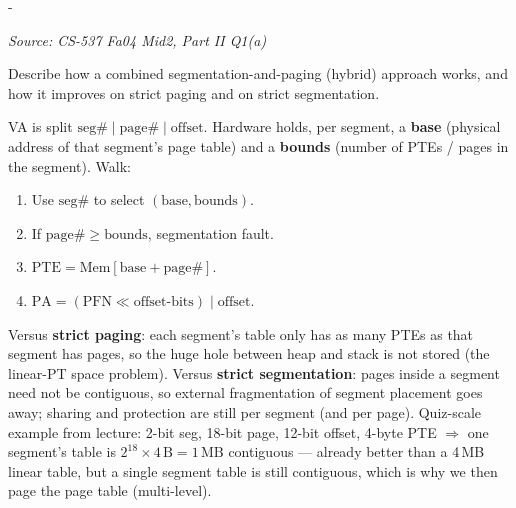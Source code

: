 \documentclass[11pt,a4paper]{article}
\makeatletter
\newcommand{\keepspace}[1]{\par\penalty-100\begingroup
  \setlength{\dimen@}{#1}\dimen@ii\pagegoal\advance\dimen@ii-\pagetotal
  \ifdim\dimen@>\dimen@ii\ifdim\dimen@ii>\z@\vfil\fi\break\fi\endgroup}
\newcounter{qn}[section]
\newenvironment{Qn}[4]{%
  \refstepcounter{qn}\keepspace{7\baselineskip}%
  \begin{tcolorbox}[qboxstyle, title={Q\thesection.\theqn\ \ [#1 \textbar\ #2]\ \ #4}]%
  {\footnotesize\color{g3}\textit{Source: #3}}\par\smallskip%
}{%
  \end{tcolorbox}%
}
\newenvironment{Sol}{%
  \begin{tcolorbox}[sboxstyle, title={Solution}]%
}{%
  \end{tcolorbox}\vspace{0.35em}%
}
\makeatother
\begin{document}
\begin{Qn}{Medium-Hard}{Lect 14}{CS-537 Fa04 Mid2, Part II Q1(a)}{Combined segmentation and paging}
Describe how a combined segmentation-and-paging (hybrid) approach works,
and how it improves on strict paging and on strict segmentation.
\end{Qn}
\begin{Sol}
VA is split $\mathrm{seg}\# \mid \mathrm{page}\# \mid \mathrm{offset}$.
Hardware holds, per segment, a \textbf{base} (physical address of that
segment's page table) and a \textbf{bounds} (number of PTEs / pages in
the segment). Walk:
\begin{enumerate}
\item Use $\mathrm{seg}\#$ to select $(\mathrm{base},\mathrm{bounds})$.
\item If $\mathrm{page}\# \ge \mathrm{bounds}$, segmentation fault.
\item $\mathrm{PTE} = \mathrm{Mem}[\mathrm{base} + \mathrm{page}\#]$.
\item $\mathrm{PA} = (\mathrm{PFN}\ll \mathrm{offset\text{-}bits})
      \mid \mathrm{offset}$.
\end{enumerate}
Versus \textbf{strict paging}: each segment's table only has as many PTEs
as that segment has pages, so the huge hole between heap and stack is not
stored (the linear-PT space problem). Versus \textbf{strict segmentation}:
pages inside a segment need not be contiguous, so external fragmentation
of segment placement goes away; sharing and protection are still per
segment (and per page). Quiz-scale example from lecture: 2-bit seg, 18-bit
page, 12-bit offset, 4-byte PTE $\Rightarrow$ one segment's table is
$2^{18}\times 4\,\mathrm{B} = 1\,\mathrm{MB}$ contiguous --- already
better than a 4\,MB linear table, but a single segment table is still
contiguous, which is why we then page the page table (multi-level).
\end{Sol}
\end{document}
